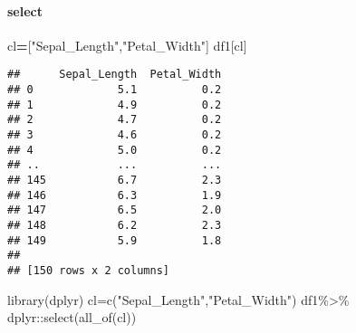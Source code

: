 \documentclass[
]{article}
\newenvironment{Shaded}{\begin{snugshade}}{\end{snugshade}}
\newcommand{\FunctionTok}[1]{\textcolor[rgb]{0.00,0.00,0.00}{#1}}
\newcommand{\NormalTok}[1]{#1}
\newcommand{\OperatorTok}[1]{\textcolor[rgb]{0.81,0.36,0.00}{\textbf{#1}}}
\newcommand{\OtherTok}[1]{\textcolor[rgb]{0.56,0.35,0.01}{#1}}
\newcommand{\SpecialCharTok}[1]{\textcolor[rgb]{0.00,0.00,0.00}{#1}}
\newcommand{\StringTok}[1]{\textcolor[rgb]{0.31,0.60,0.02}{#1}}
\begin{document}
\hypertarget{select}{%
\paragraph{\texorpdfstring{{ select }}{ select }}\label{select}}

\begin{Shaded}
\begin{Highlighting}[]
\NormalTok{cl}\OperatorTok{=}\NormalTok{[}\StringTok{"Sepal\_Length"}\NormalTok{,}\StringTok{"Petal\_Width"}\NormalTok{]}
\NormalTok{df1[cl]}
\end{Highlighting}
\end{Shaded}

\begin{verbatim}
##      Sepal_Length  Petal_Width
## 0             5.1          0.2
## 1             4.9          0.2
## 2             4.7          0.2
## 3             4.6          0.2
## 4             5.0          0.2
## ..            ...          ...
## 145           6.7          2.3
## 146           6.3          1.9
## 147           6.5          2.0
## 148           6.2          2.3
## 149           5.9          1.8
## 
## [150 rows x 2 columns]
\end{verbatim}

\begin{Shaded}
\begin{Highlighting}[]
\FunctionTok{library}\NormalTok{(dplyr)}
\NormalTok{cl}\OtherTok{=}\FunctionTok{c}\NormalTok{(}\StringTok{"Sepal\_Length"}\NormalTok{,}\StringTok{"Petal\_Width"}\NormalTok{)}
\NormalTok{df1}\SpecialCharTok{\%\textgreater{}\%}\NormalTok{ dplyr}\SpecialCharTok{::}\FunctionTok{select}\NormalTok{(}\FunctionTok{all\_of}\NormalTok{(cl))}
\end{Highlighting}
\end{Shaded}
\end{document}
